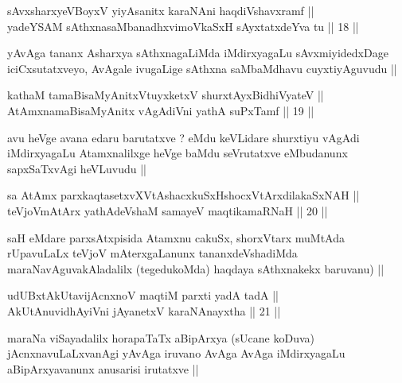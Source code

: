 \begin{shl}
sAvxsharxyeVBoyxV yiyAsanitx karaNAni haqdiVshavxramf || \\
yadeYSAM sAthxnasaMbanadhxvimoVkaSxH sAyxtatxdeYva tu ||  18 ||  
\end{shl}

\begin{artha}
yAvAga tananx Asharxya sAthxnagaLiMda iMdirxyagaLu sAvxmiyidedxDage
iciCxsutatxveyo, AvAgale ivugaLige sAthxna saMbaMdhavu cuyxtiyAguvudu ||
\end{artha}

\begin{shl}
kathaM tamaBisaMyAnitxVtuyxketxV shurxtAyx\s BidhiVyateV || \\
AtAmxnamaBisaMyAnitx vAgAdiVni yathA suPxTamf ||  19 || 
\end{shl}

\begin{artha}
avu heVge avana edaru barutatxve ? eMdu keVLidare shurxtiyu vAgAdi
iMdirxyagaLu Atamxnalilxge heVge baMdu seVrutatxve eMbudanunx
sapxSaTxvAgi heVLuvudu ||
\end{artha}


\begin{shl}
sa AtAmx parxkaqtasetxvXVtAshacxkuSxHshocxVtArxdilakaSxNAH ||  \\
teVjoVmAtArx yathAdeVshaM samayeV maqtikamaRNaH ||  20 ||  
\end{shl}

\begin{artha}
saH eMdare parxsAtxpisida Atamxnu cakuSx, shorxVtarx muMtAda
rUpavuLaLx teVjoV mAterxgaLanunx tananxdeVshadiMda
maraNavAguvakAladalilx (tegedukoMda) haqdaya sAthxnakekx baruvanu) ||
\end{artha}

\begin{shl}
udUBxtAkUtavijAcnxnoV maqtiM parxti yadA tadA || \\
AkUtAnuvidhAyiVni jAyanetxV karaNAnayxtha ||  21 ||  
\end{shl}

\begin{artha}
maraNa viSayadalilx horapaTaTx aBipArxya (sUcane koDuva)
jAcnxnavuLaLxvanAgi yAvAga iruvano AvAga AvAga iMdirxyagaLu
aBipArxyavanunx anusarisi irutatxve ||
\end{artha}


